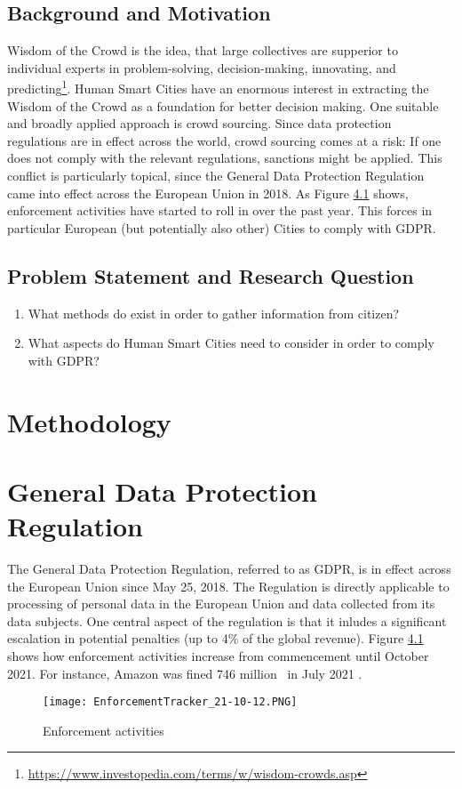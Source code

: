 \documentclass[a4paper,12pt]{report}
\begin{document}
	\section{Background and Motivation}
	\startsection
		Wisdom of the Crowd is the idea, that large collectives are supperior to individual experts in problem-solving, decision-making, innovating, and predicting\footnote{\url{https://www.investopedia.com/terms/w/wisdom-crowds.asp}}. 
		Human Smart Cities have an enormous interest in extracting the Wisdom of the Crowd as a foundation for better decision making.
		One suitable and broadly applied approach is crowd sourcing.
		Since data protection regulations are in effect across the world, crowd sourcing comes at a risk: If one does not comply with the relevant regulations, sanctions might be applied.
		This conflict is particularly topical, since the General Data Protection Regulation came into effect across the European Union in 2018.
		As Figure \ref{fig:enforcement_tracker} shows, enforcement activities have started to roll in over the past year. This forces in particular European (but potentially also other) Cities to comply with GDPR.
	\closesection

	\section{Problem Statement and Research Question}
	\startsection
		\begin{enumerate}
			\item What methods do exist in order to gather information from citizen?
			\item What aspects do Human Smart Cities need to consider in order to comply with GDPR?
		\end{enumerate}
	\closesection
	
	
	\chapter{Methodology}


	\chapter{General Data Protection Regulation} 
	The General Data Protection Regulation, referred to as GDPR, is in effect across the European Union since May 25, 2018.
	The Regulation is directly applicable to processing of personal data in the European Union and data collected from its data subjects.
	One central aspect of the regulation is that it inludes a significant escalation in potential penalties (up to 4\% of the global revenue).
	Figure \ref{fig:enforcement_tracker} shows how enforcement activities increase from commencement until October 2021.
	For instance, Amazon was fined 746 million \texteuro \ in July 2021 \cite{EnforcementTracker}.
	\begin{figure}
		\centering
		\texttt{[image: EnforcementTracker\_21-10-12.PNG]}
		\caption{Enforcement activities \cite{EnforcementTracker}}
		\label{fig:enforcement_tracker}
	\end{figure}
	
\end{document}
